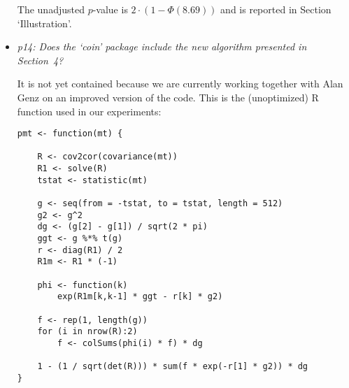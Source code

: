 \documentclass[11pt,a4paper]{article}
\begin{document}
\begin{itemize}
	The unadjusted $p$-value is $2 \cdot (1 - \Phi(8.69))$ and is reported in 
        Section `Illustration'.
	
  \item \textit{p14: Does the `coin' package include the new algorithm presented in
        Section~4?}
	
	It is not yet contained because we are currently working together with Alan Genz
	on an improved version of the code. This is the (unoptimized) R function
        used in our experiments:
\begin{verbatim}
pmt <- function(mt) {

    R <- cov2cor(covariance(mt))
    R1 <- solve(R)
    tstat <- statistic(mt)

    g <- seq(from = -tstat, to = tstat, length = 512)
    g2 <- g^2
    dg <- (g[2] - g[1]) / sqrt(2 * pi)
    ggt <- g %*% t(g)
    r <- diag(R1) / 2
    R1m <- R1 * (-1)

    phi <- function(k)
        exp(R1m[k,k-1] * ggt - r[k] * g2)

    f <- rep(1, length(g))
    for (i in nrow(R):2)
        f <- colSums(phi(i) * f) * dg

    1 - (1 / sqrt(det(R))) * sum(f * exp(-r[1] * g2)) * dg
}
\end{verbatim}    


\end{itemize}
\end{document}
